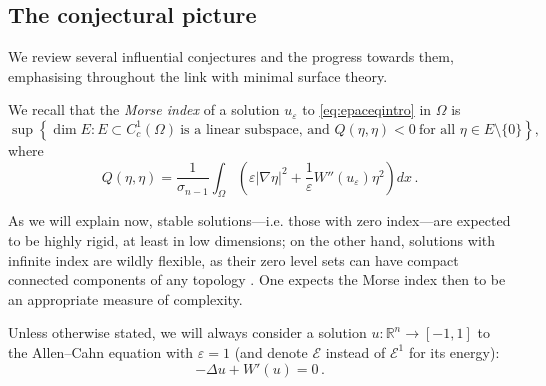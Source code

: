 \documentclass{article}
\newcommand{\ep}{\varepsilon}
\theoremstyle{definition}
\begin{document}
\subsection{The conjectural picture}\label{sec:wwredclas}
We review several influential conjectures and the progress towards them, emphasising throughout the link with minimal surface theory.

We recall that the \textit{Morse index} of a solution $u_\ep$ to \eqref{eq:epaceqintro} in $\Omega$ is
$$
\sup\left\{\dim E : E\subset C_c^1(\Omega)\ \mbox{is a linear subspace, and }
Q(\eta,\eta)<0\ \mbox{for all } \eta\in E\setminus\{0\}\right\},
$$
where
\begin{equation}\label{eq:2vardef}
    Q(\eta,\eta)=\frac{1}{\sigma_{n-1}}\int_{\Omega} \left(\ep|\nabla \eta|^2 + \frac{1}{\ep} W''(u_\ep)\eta^2 \right) dx\,.
\end{equation}


As we will explain now, stable solutions---i.e. those with zero index---are expected to be highly rigid, at least in low dimensions; on the other hand, solutions with infinite index are wildly flexible, as their zero level sets can have compact connected components of any topology \cite{EP16}. One expects the Morse index then to be an appropriate measure of complexity.

Unless otherwise stated, we will always consider a solution $u : \mathbb{R}^n \to [-1, 1]$ to the Allen--Cahn equation with $\varepsilon = 1$ (and denote $\mathcal E$ instead of $\mathcal E^1$ for its energy):
\begin{equation}\label{eq:aceqintro}
    -\Delta u + W'(u) = 0\,.
\end{equation}
\end{document}
